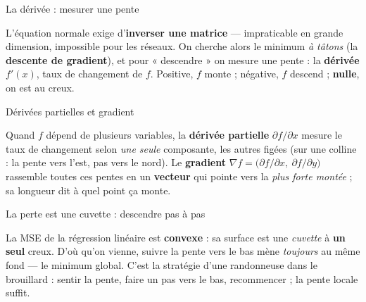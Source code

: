 \documentclass[aspectratio=169,11pt]{beamer}
\begin{document}
\begin{frame}{La dérivée : mesurer une pente}
\begin{ucaddef}
{\small L'équation normale exige d'\textbf{inverser une matrice} — impraticable en grande dimension, impossible pour les réseaux. On cherche alors le minimum \emph{à tâtons} (la \textbf{descente de gradient}), et pour « descendre » on mesure une pente : la \textbf{dérivée} $f'(x)$, taux de changement de $f$. Positive, $f$ monte ; négative, $f$ descend ; \textbf{nulle}, on est au creux.}
\end{ucaddef}
\end{frame}

\begin{frame}{Dérivées partielles et gradient}
\begin{ucaddef}
{\small Quand $f$ dépend de plusieurs variables, la \textbf{dérivée partielle} $\partial f/\partial x$ mesure le taux de changement selon \emph{une seule} composante, les autres figées (sur une colline : la pente vers l'est, pas vers le nord). Le \textbf{gradient} $\nabla f = \big(\partial f/\partial x,\ \partial f/\partial y\big)$ rassemble toutes ces pentes en un \textbf{vecteur} qui pointe vers la \emph{plus forte montée} ; sa longueur dit à quel point ça monte.}
\end{ucaddef}
\end{frame}

\begin{frame}{La perte est une cuvette : descendre pas à pas}
\begin{ucaddef}
{\small La MSE de la régression linéaire est \textbf{convexe} : sa surface est une \emph{cuvette} à \textbf{un seul} creux. D'où qu'on vienne, suivre la pente vers le bas mène \emph{toujours} au même fond — le minimum global. C'est la stratégie d'une randonneuse dans le brouillard : sentir la pente, faire un pas vers le bas, recommencer ; la pente locale suffit.}
\end{ucaddef}
\end{frame}
\end{document}
